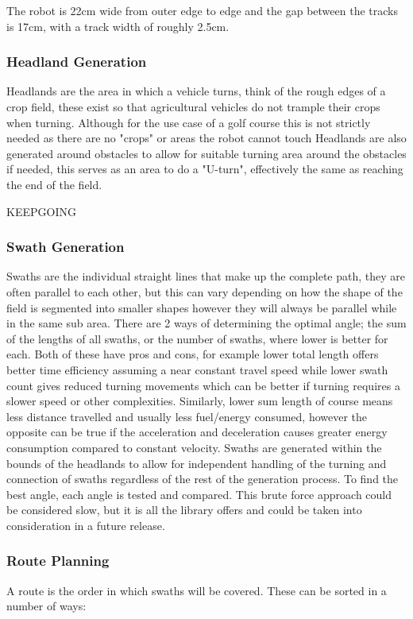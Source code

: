 \documentclass[final]{cmpreport_02}
\begin{document}
The robot is 22cm wide from outer edge to edge and the gap between the tracks is 17cm, with a track width of roughly 2.5cm.


\subsubsection{Headland Generation}
Headlands are the area in which a vehicle turns, think of the rough edges of a crop field, these exist so that agricultural vehicles do not trample their crops when turning.
Although for the use case of a golf course this is not strictly needed as there are no "crops" or areas the robot cannot touch
Headlands are also generated around obstacles to allow for suitable turning area around the obstacles if needed, this serves as an area to do a "U-turn", effectively the same as reaching the end of the field.

KEEPGOING



\subsubsection{Swath Generation}
Swaths are the individual straight lines that make up the complete path,
they are often parallel to each other, but this can vary depending on how the shape of the field is segmented into smaller shapes however they will always be parallel while in the same sub area.
There are 2 ways of determining the optimal angle; the sum of the lengths of all swaths, or the number of swaths, where lower is better for each.
Both of these have pros and cons, for example lower total length offers better time efficiency assuming a near constant travel speed while lower swath count gives reduced turning movements which can be better if turning requires a slower speed or other complexities.
Similarly, lower sum length of course means less distance travelled and usually less fuel/energy consumed, however the opposite can be true if the acceleration and deceleration causes greater energy consumption compared to constant velocity.
Swaths are generated within the bounds of the headlands to allow for independent handling of the turning and connection of swaths regardless of the rest of the generation process.
To find the best angle, each angle is tested and compared. This brute force approach could be considered slow, but it is all the library offers and could be taken into consideration in a future release.

\subsubsection{Route Planning}
A route is the order in which swaths will be covered.
These can be sorted in a number of ways:
\end{document}
